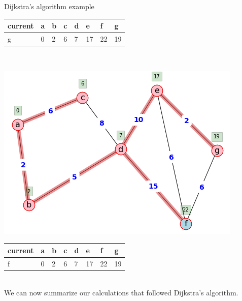 \begin{example}{Dijkstra's algorithm example}{}
\begin{minipage}{0.5\textwidth}
\end{minipage}
\begin{minipage}{0.5\textwidth}
          \begin{tabular}{|l|l|l|l|l|l|l|l|}
    \hline
        current & a & b & c & d & e & f & g \\ \hline
        g & 0 & 2 & 6 & 7 & 17 & 22 & 19  \\ \hline
    \end{tabular}
     \end{minipage}\\
\begin{minipage}{0.5\textwidth}
\includegraphics[scale = 0.5]{graph-theory-graphics/dijkstra7.png} 
\end{minipage}
\begin{minipage}{0.5\textwidth}
 \begin{tabular}{|l|l|l|l|l|l|l|l|}
    \hline
        current & a & b & c & d & e & f & g \\ \hline
        f & 0 & 2 & 6 & 7 & 17 & 22 & 19  \\ \hline
    \end{tabular}
\end{minipage}\\

We can now summarize our calculations that followed Dijkstra's algorithm.\\


\end{example}
